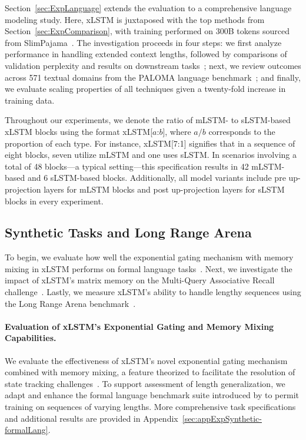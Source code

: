 Section~\ref{sec:ExpLanguage} extends the evaluation to a comprehensive language modeling study. Here, xLSTM is juxtaposed with the top methods from Section~\ref{sec:ExpComparison}, with training performed on 300B tokens sourced from SlimPajama~\citep{Soboleva:23}. The investigation proceeds in four steps: we first analyze performance in handling extended context lengths, followed by comparisons of validation perplexity and results on downstream tasks~\citep{Sutawika:24}; next, we review outcomes across 571 textual domains from the PALOMA language benchmark~\citep{Magnusson:23arxivshort}; and finally, we evaluate scaling properties of all techniques given a twenty-fold increase in training data.

\label{sec:xlstm_blocks_notation}
Throughout our experiments, we denote the ratio of mLSTM- to sLSTM-based xLSTM blocks using the format xLSTM[$a$:$b$], where $a/b$ corresponds to the proportion of each type. For instance, xLSTM[7:1] signifies that in a sequence of eight blocks, seven utilize mLSTM and one uses sLSTM. In scenarios involving a total of 48 blocks—a typical setting—this specification results in 42 mLSTM-based and 6 sLSTM-based blocks. Additionally, all model variants include pre up-projection layers for mLSTM blocks and post up-projection layers for sLSTM blocks in every experiment.

\subsection{Synthetic Tasks and Long Range Arena}
\label{sec:ExpSyntethic}
To begin, we evaluate how well the exponential gating mechanism with memory mixing in xLSTM performs on formal language tasks~\citep{Deletang:23}. Next, we investigate the impact of xLSTM's matrix memory on the Multi-Query Associative Recall challenge~\citep{Arora:23arxiv}. Lastly, we measure xLSTM's ability to handle lengthy sequences using the Long Range Arena benchmark~\citep{Tay:21}.

\paragraph{Evaluation of xLSTM's Exponential Gating and Memory Mixing Capabilities.} We evaluate the effectiveness of xLSTM's novel exponential gating mechanism combined with memory mixing, a feature theorized to facilitate the resolution of state tracking challenges~\citep{Merrill:24, Merrill:23}. To support assessment of length generalization, we adapt and enhance the formal language benchmark suite introduced by \citet{Deletang:23} to permit training on sequences of varying lengths. More comprehensive task specifications and additional results are provided in Appendix~\ref{sec:appExpSynthetic-formalLang}. 


